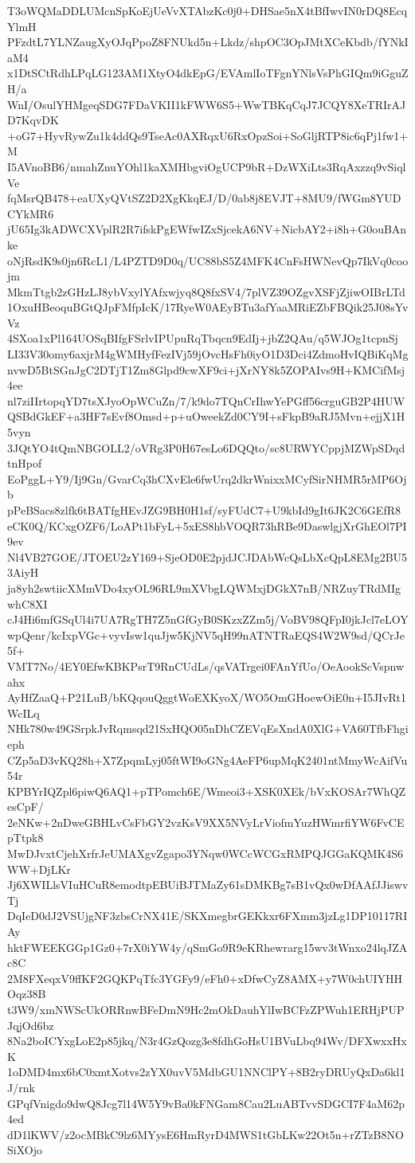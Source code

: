 T3oWQMaDDLUMcnSpKoEjUeVvXTAbzKc0j0+DHSae5nX4tBfIwvIN0rDQ8EcqYlmH
PFzdtL7YLNZaugXyOJqPpoZ8FNUkd5n+Lkdz/shpOC3OpJMtXCeKbdb/fYNkIaM4
x1DtSCtRdhLPqLG123AM1XtyO4dkEpG/EVAmlIoTFgnYNlsVsPhGIQm9iGguZH/a
WnI/OsulYHMgeqSDG7FDaVKII1kFWW6S5+WwTBKqCqJ7JCQY8XeTRIrAJD7KqvDK
+oG7+HyvRywZu1k4ddQs9TseAc0AXRqxU6RxOpzSoi+SoGljRTP8ic6qPj1fw1+M
I5AVnoBB6/nmahZnuYOhl1kaXMHbgviOgUCP9bR+DzWXiLts3RqAxzzq9vSiqlVe
fqMsrQB478+eaUXyQVtSZ2D2XgKkqEJ/D/0ab8j8EVJT+8MU9/fWGm8YUDCYkMR6
jU65Ig3kADWCXVplR2R7ifskPgEWfwIZxSjcekA6NV+NicbAY2+i8h+G0ouBAnke
oNjRsdK9s0jn6RcL1/L4PZTD9D0q/UC88bS5Z4MFK4CnFsHWNevQp7IkVq0coojm
MkmTtgb2zGHzLJ8ybVxylYAfxwjyq8Q8fxSV4/7plVZ39OZgvXSFjZjiwOIBrLTd
1OxuHBeoquBGtQJpFMfpIcK/17RyeW0AEyBTu3afYaaMRiEZbFBQik25J08sYvVz
4SXoa1xPl164UOSqBIfgFSrlvIPUpuRqTbqcn9EdIj+jbZ2QAu/q5WJOg1tcpnSj
LI33V30omy6axjrM4gWMHyfFezIVj59jOvcHsFh0iyO1D3Dci4ZdmoHvIQBiKqMg
nvwD5BtSGnJgC2DTjT1Zm8Glpd9cwXF9ci+jXrNY8k5ZOPAIvs9H+KMCifMsj4ee
nl7ziIIrtopqYD7tsXJyoOpWCuZn/7/k9do7TQnCrIhwYePGff56crguGB2P4HUW
QSBdGkEF+a3HF7sEvf8Omsd+p+uOweekZd0CY9I+sFkpB9aRJ5Mvn+ejjX1H5vyn
3JQtYO4tQmNBGOLL2/oVRg3P0H67esLo6DQQto/sc8URWYCppjMZWpSDqdtnHpof
EoPggL+Y9/Ij9Gn/GvarCq3hCXvEle6fwUrq2dkrWnixxMCyfSirNHMR5rMP6Ojb
pPeBSacs8zlfk6tBATfgHEvJZG9BH0H1sf/syFUdC7+U9kbId9gIt6JK2C6GEfR8
eCK0Q/KCxgOZF6/LoAPt1bFyL+5xES8hbVOQR73hRBe9DaswlgjXrGhEOl7PI9ev
Nl4VB27GOE/JTOEU2zY169+SjeOD0E2pjdJCJDAbWcQsLbXcQpL8EMg2BU53AiyH
ja8yh2swtiicXMmVDo4xyOL96RL9mXVbgLQWMxjDGkX7nB/NRZuyTRdMIgwhC8XI
cJ4Hi6mfGSqUl4i7UA7RgTH7Z5nGfGyB0SKzxZZm5j/VoBV98QFpI0jkJcl7eLOY
wpQenr/kcIxpVGc+vyvIsw1quJjw5KjNV5qH99nATNTRaEQS4W2W9sd/QCrJe5f+
VMT7No/4EY0EfwKBKPsrT9RnCUdLs/qsVATrgei0FAnYfUo/OeAookScVspnwahx
AyHfZaaQ+P21LuB/bKQqouQggtWoEXKyoX/WO5OmGHoewOiE0n+I5JIvRt1WcILq
NHk780w49GSrpkJvRqmsqd21SxHQO05nDhCZEVqEsXndA0XlG+VA60TfbFhgieph
CZp5aD3vKQ28h+X7ZpqmLyj05ftWI9oGNg4AeFP6upMqK2401ntMmyWcAifVu54r
KPBYrIQZpl6piwQ6AQ1+pTPomch6E/Wmeoi3+XSK0XEk/bVxKOSAr7WhQZesCpF/
2eNKw+2nDweGBHLvCsFbGY2vzKsV9XX5NVyLrViofmYuzHWmrfiYW6FvCEpTtpk8
MwDJvxtCjehXrfrJeUMAXgvZgapo3YNqw0WCcWCGxRMPQJGGaKQMK4S6WW+DjLKr
Jj6XWILlsVIuHCuR8emodtpEBUiBJTMaZy61sDMKBg7sB1vQx0wDfAAfJJiswvTj
DqIeD0dJ2VSUjgNF3zbsCrNX41E/SKXmegbrGEKkxr6FXmm3jzLg1DP10117RIAy
hktFWEEKGGp1Gz0+7rX0iYW4y/qSmGo9R9eKRhewrarg15wv3tWnxo24lqJZAc8C
2M8FXeqxV9ffKF2GQKPqTfc3YGFy9/eFh0+xDfwCyZ8AMX+y7W0chUIYHHOqz38B
t3W9/xmNWScUkORRnwBFeDmN9Hc2mOkDauhYlIwBCFzZPWuh1ERHjPUPJqjOd6bz
8Na2boICYxgLoE2p85jkq/N3r4GzQozg3e8fdhGoHsU1BVuLbq94Wv/DFXwxxHxK
1oDMD4mx6bC0xmtXotvs2zYX0uvV5MdbGU1NNClPY+8B2ryDRUyQxDa6kl1J/rnk
GPqfVnigdo9dwQ8Jcg7l14W5Y9vBa0kFNGam8Cau2LuABTvvSDGCI7F4aM62p4ed
dD1lKWV/z2ocMBkC9lz6MYysE6HmRyrD4MWS1tGbLKw22Ot5n+rZTzB8NOSiXOjo
